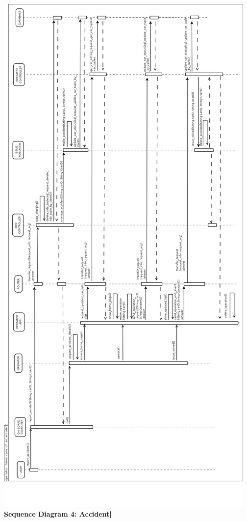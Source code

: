 \documentclass{article}
\begin{document}
\begin{flushleft}
\newpage
\includegraphics[scale=0.25]{seq4_accident} 
\newpage
\textbf{Sequence Diagram 4: Accident|}
\break

\end{flushleft}
\end{document}
